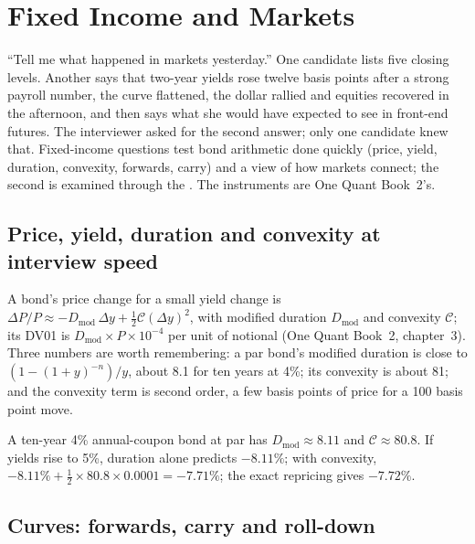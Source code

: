 \chapter{Fixed Income and Markets}\label{ch:iv:fixed-income-and-markets}

``Tell me what happened in markets yesterday.'' One candidate lists five closing levels. Another says that two-year
yields rose twelve basis points after a strong payroll number, the curve flattened, the dollar rallied and equities
recovered in the afternoon, and then says what she would have expected to see in front-end futures. The interviewer
asked for the second answer; only one candidate knew that. Fixed-income questions test bond arithmetic done quickly
(price, yield, duration, convexity, forwards, carry) and a view of how markets connect; the second is examined through
the . The instruments are One Quant Book~2's.

\section{Price, yield, duration and convexity at interview speed}

A bond's price change for a small yield change is $\Delta P/P \approx -D_{\mathrm{mod}}\,\Delta y + \tfrac12\mathcal
C(\Delta y)^2$, with modified duration $D_{\mathrm{mod}}$ and convexity $\mathcal C$; its DV01 is $D_{\mathrm{mod}} \times
P \times 10^{-4}$ per unit of notional (One Quant Book~2, chapter~3). Three numbers are worth remembering: a par bond's
modified duration is close to $(1 - (1+y)^{-n})/y$, about 8.1 for ten years at 4\%; its convexity is about 81; and the
convexity term is second order, a few basis points of price for a 100 basis point move.

\begin{example}\label{ex:iv:fixed-income-and-markets:selloff}
A ten-year 4\% annual-coupon bond at par has $D_{\mathrm{mod}} \approx 8.11$ and $\mathcal C \approx 80.8$. If yields rise
to 5\%, duration alone predicts $-8.11\%$; with convexity, $-8.11\% + \tfrac12 \times 80.8 \times 0.0001 = -7.71\%$; the
exact repricing gives $-7.72\%$.
\end{example}

\section{Curves: forwards, carry and roll-down}

